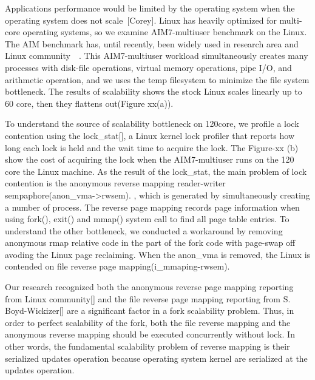 Applications performance would be limited by the operating system when the
operating system does not scale~\cite{Clements15SCR}[Corey].
Linux has heavily optimized for multi-core operating systems, so we examine
AIM7-multiuser benchmark on the Linux.
The AIM benchmark has, until recently, been widely used in research area
and Linux community~\cite{Bueso2015STP}~\cite{Bueso2014MCS}.
This AIM7-multiuser workload simultaneously creates many processes with
disk-file operations, virtual memory operations, pipe I/O, and arithmetic
operation, and we uses the temp filesystem to minimize the file system
bottleneck.
The results of scalability shows the stock Linux scales linearly up to 60 core,
then they flattens out(Figure xx(a)).


To understand the source of scalability bottleneck on 120core, we profile a lock
contention using the lock\_stat[], a Linux kernel lock profiler that reports how
long each lock is held and the wait time to acquire the lock.
The Figure-xx (b) show the cost of acquiring the lock when the AIM7-multiuser
runs on the 120 core the Linux machine.
As the result of the lock\_stat, the main problem of lock contention is the
anonymous reverse mapping reader-writer sempaphore(anon\_vma->rwsem).
, which is generated by simultaneously creating a number of process.
The reverse page mapping records page information when using fork(), exit() and
mmap() system call to find all page table entries.
To understand the other bottleneck, we conducted a workaround by removing
anonymous rmap relative code in the part of the fork code with page-swap off
avoding the Linux page reclaiming.
When the anon\_vma is removed, the Linux is contended on file reverse page
mapping(i\_mmaping-rwsem).


Our research recognized both the anonymous reverse page mapping
reporting from Linux community[] and the file reverse page mapping reporting from S.
Boyd-Wickizer[] are a significant factor in a fork scalability problem.
Thus, in order to perfect scalability of the fork, both the
file reverse mapping and the anonymous reverse mapping should be executed
concurrently without lock.
In other words, the fundamental scalability problem of reverse mapping is their
serialized updates operation because operating system kernel are serialized at
the updates operation.

